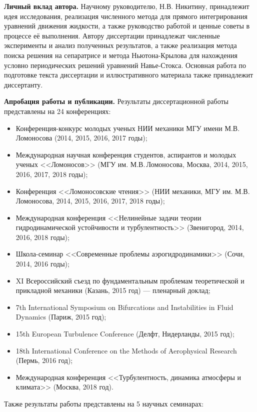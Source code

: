 {\bf Личный вклад автора.} 
Научному руководителю, Н.В. Никитину, принадлежит идея исследования, реализация численного метода для прямого интегрирования уравнений движения жидкости, а также руководство работой и ценные советы в процессе её выполнения. Автору диссертации принадлежат численные эксперименты и анализ полученных результатов, а также реализация метода поиска решения на сепаратрисе и метода Ньютона-Крылова для нахождения условно периодических решений уравнений Навье-Стокса. Основная работа по подготовке текста диссертации и иллюстративного материала также принадлежит диссертанту. 


{\bf Апробация работы и публикации.} 
Результаты диссертационной работы представлены на 24 конференциях: 
\begin{itemize}
\item Конференция-конкурс молодых ученых НИИ механики МГУ имени М.В. Ломоносова (2014, 2015, 2016, 2017 годы); 
\item Международная научная конференция студентов, аспирантов и молодых ученых <<Ломоносов>> (МГУ им. М.В.\,Ломоносова, Москва, 2014, 2015, 2016, 2017, 2018 годы); 
\item Конференция <<Ломоносовские чтения>> (НИИ механики, МГУ им. М.В. Ломоносова, 2014, 2015, 2016, 2017, 2018 годы); 
\item Международная конференция <<Нелинейные задачи теории гидродинамической устойчивости и турбулентность>> (Звенигород, 2014, 2016, 2018 годы); 
\item Школа-семинар <<Современные проблемы аэрогидродинамики>> (Сочи, 2014, 2016 годы);  
\item XI Всероссийский съезд по фундаментальным проблемам теоретической и прикладной механики (Казань, 2015 год) --- пленарный доклад;
\item 7th International Symposium on Bifurcations and Instabilities in Fluid Dynamics (Париж, 2015 год);
\item 15th European Turbulence Conference (Делфт, Нидерланды, 2015 год); 
\item 18th International Conference on the Methods of Aerophysical Research (Пермь, 2016 год);
\item Международная конференция <<Турбулентность, динамика атмосферы и климата>> (Москва, 2018 год).
\end{itemize}
Также результаты работы представлены на 5 научных семинарах:
